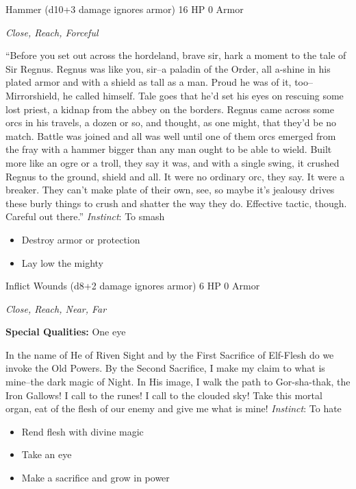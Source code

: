 Hammer (d10+3 damage ignores armor)\hspace*{\fill} 16 HP 0 Armor

\emph{Close, Reach, Forceful}

\HRule
``Before you set out across the hordeland, brave sir, hark a moment to the tale of Sir Regnus. Regnus was like you, sir--a paladin of the Order, all a-shine in his plated armor and with a shield as tall as a man. Proud he was of it, too--Mirrorshield, he called himself. Tale goes that he'd set his eyes on rescuing some lost priest, a kidnap from the abbey on the borders. Regnus came across some orcs in his travels, a dozen or so, and thought, as one might, that they'd be no match. Battle was joined and all was well until one of them orcs emerged from the fray with a hammer bigger than any man ought to be able to wield. Built more like an ogre or a troll, they say it was, and with a single swing, it crushed Regnus to the ground, shield and all. It were no ordinary orc, they say. It were a breaker. They can't make plate of their own, see, so maybe it's jealousy drives these burly things to crush and shatter the way they do. Effective tactic, though. Careful out there.'' \emph{Instinct}: To smash
\begin{itemize}
\item Destroy armor or protection
\item Lay low the mighty
\end{itemize}
\newpage
\HRule
{}

Inflict Wounds (d8+2 damage ignores armor)\hspace*{\fill} 6 HP 0 Armor

\emph{Close, Reach, Near, Far}

\textbf{Special Qualities:}
One eye

\HRule
In the name of He of Riven Sight and by the First Sacrifice of Elf-Flesh do we invoke the Old Powers. By the Second Sacrifice, I make my claim to what is mine--the dark magic of Night. In His image, I walk the path to Gor-sha-thak, the Iron Gallows! I call to the runes! I call to the clouded sky! Take this mortal organ, eat of the flesh of our enemy and give me what is mine! \emph{Instinct}: To hate
\begin{itemize}
\item Rend flesh with divine magic
\item Take an eye
\item Make a sacrifice and grow in power
\end{itemize}

